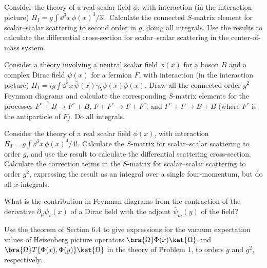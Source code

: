 
\begin{enumerate}
 Consider the theory of a real scalar field $\phi$, with interaction
(in the interaction picture)
$H_I=g\int \dd^3x\,\phi(x)^3/3!$.
Calculate the connected $S$-matrix element for scalar--scalar scattering to
second order in $g$, doing all integrals. Use the results to calculate the
differential cross-section for scalar--scalar scattering in the
center-of-mass system.

 Consider a theory involving a neutral scalar field $\phi(x)$ for a
boson $B$ and a complex Dirac field $\psi(x)$ for a fermion $F$, with
interaction (in the interaction picture)
$H_I=ig\int \dd^3x\,\bar\psi(x)\gamma_5\psi(x)\phi(x)$.
Draw all the connected order-$g^2$ Feynman diagrams and calculate the
corresponding $S$-matrix elements for the processes
$F^c+B\to F^c+B$, $F+F^c\to F+F^c$, and $F^c+F\to B+B$
(where $F^c$ is the antiparticle of $F$). Do all integrals.

 Consider the theory of a real scalar field $\phi(x)$, with interaction
$H_I=g\int \dd^3x\,\phi(x)^4/4!$.
Calculate the $S$-matrix for scalar--scalar scattering to order $g$, and use
the result to calculate the differential scattering cross-section. Calculate
the correction terms in the $S$-matrix for scalar--scalar scattering to order
$g^2$, expressing the result as an integral over a single four-momentum, but
do all $x$-integrals.

 What is the contribution in Feynman diagrams from the contraction of
the derivative $\partial_\mu\psi_\ell(x)$ of a Dirac field with the adjoint
$\bar\psi_m(y)$ of the field?

 Use the theorem of Section 6.4 to give expressions for the vacuum
expectation values of Heisenberg picture operators
$\bra{\Omega}\Phi(x)\ket{\Omega}$ and
$\bra{\Omega}T\{\Phi(x),\Phi(y)\}\ket{\Omega}$ in the theory of Problem 1,
to orders $g$ and $g^2$, respectively.
\end{enumerate}
